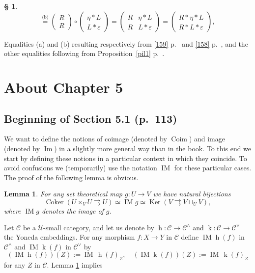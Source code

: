 \documentclass[12pt]{article}
\newtheorem{lem}[thm]{Lemma}
\theoremstyle{remark}
\theoremstyle{definition}
\newtheorem{s}[thm]{\S}
\newcommand{\nn}{\noindent}
\newcommand{\C}{\mathcal C}
\newcommand{\U}{\mathcal U}
\newcommand{\ee}{\varepsilon}
\newcommand{\parar}{\rightrightarrows}
\DeclareMathOperator{\Coim}{Coim}
\DeclareMathOperator{\Coker}{Coker}
\DeclareMathOperator{\Ima}{Im}
\DeclareMathOperator{\IM}{IM}
\DeclareMathOperator{\hy}{h}
\DeclareMathOperator{\ky}{k}
\DeclareMathOperator{\Ker}{Ker}
\begin{document}
\begin{s}
$$
\overset{\text{(b)}}{=}\begin{pmatrix}R\\ R\end{pmatrix}\circ\begin{pmatrix}\eta*L\\ L*\ee\end{pmatrix}
=\begin{pmatrix}R&\eta*L\\ R&L*\ee\end{pmatrix}
=\begin{pmatrix}R*\eta*L\\ R*L*\ee\end{pmatrix},
$$ 

\nn Equalities (a) and (b) resulting respectively from \eqref{159} p.~\pageref{159} and \eqref{158} p.~\pageref{158}, and the other equalities following from Proposition~\ref{pil1} p.~\pageref{pil1}. 
\end{s}


\section{About Chapter 5}

\subsection{Beginning of Section 5.1 (p.~113)}

We want to define the notions of coimage (denoted by $\Coim$) and image (denoted by $\Ima$) in a slightly more general way than in the book. To this end we start by defining these notions in a particular context in which they coincide. To avoid confusions we (temporarily) use the notation $\IM$ for these particular cases. The proof of the following lemma is obvious. 

\begin{lem}\label{imset} 
For any set theoretical map $g:U\to V$ we have natural bijections 
$$ 
\Coker(U\times_VU\parar U)\simeq\IM g\simeq\Ker(V\parar V\sqcup_UV),
$$ 
where $\IM g$ denotes the image of $g$. 
\end{lem} 

Let $\C$ be a $\U$-small category, and let us denote by $\hy:\C\to\C^\wedge$ and $\ky:\C\to\C^\vee$ the Yoneda embeddings. For any morphism $f:X\to Y$ in $\C$ define $\IM\hy(f)$ in $\C^\wedge$ and $\IM\ky(f)$ in $\C^\vee$ by
$$
(\IM\hy(f))(Z):=\IM\,\hy(f)_Z,\quad(\IM\ky(f))(Z):=\IM\,\ky(f)_Z 
$$
for any $Z$ in $\C$. Lemma \ref{imset} implies
\end{document}

